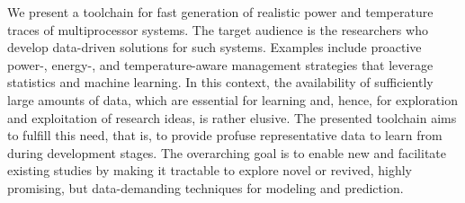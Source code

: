 We present a toolchain for fast generation of realistic power and temperature
traces of multiprocessor systems. The target audience is the researchers who
develop data-driven solutions for such systems. Examples include proactive
\mbox{power-,} \mbox{energy-,} and temperature-aware management strategies that
leverage statistics and machine learning. In this context, the availability of
sufficiently large amounts of data, which are essential for learning and, hence,
for exploration and exploitation of research ideas, is rather elusive. The
presented toolchain aims to fulfill this need, that is, to provide profuse
representative data to learn from during development stages. The overarching
goal is to enable new and facilitate existing studies by making it tractable to
explore novel or revived, highly promising, but data-demanding techniques for
modeling and prediction.
